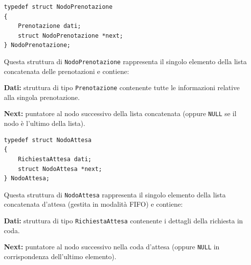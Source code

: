 \documentclass[11pt,a4paper,oneside,openany]{book}
\newenvironment{listacomp}{%
    \small
    \begin{list}{\textendash}{%
        \setlength{\topsep}{2pt}%
        \setlength{\partopsep}{0pt}%
        \setlength{\itemsep}{1pt}%
        \setlength{\parsep}{0pt}%
        \setlength{\leftmargin}{1.2em}%
    }%
}{%
    \end{list}%
}
\begin{document}
\vspace{0.2cm}
\begin{samepage}
\begin{lstlisting}[caption={Definizione della struttura NodoPrenotazione}]
typedef struct NodoPrenotazione
{
    Prenotazione dati;
    struct NodoPrenotazione *next;
} NodoPrenotazione;
\end{lstlisting}
Questa struttura di \texttt{NodoPrenotazione} rappresenta il singolo elemento della lista concatenata delle prenotazioni e contiene:
\begin{listacomp}
    \item \textbf{Dati:} struttura di tipo \texttt{Prenotazione} contenente tutte le informazioni relative alla singola prenotazione.
    \item \textbf{Next:} puntatore al nodo successivo della lista concatenata (oppure \texttt{NULL} se il nodo è l'ultimo della lista).
\end{listacomp}
\end{samepage}

\vspace{0.2cm}
\begin{samepage}
\begin{lstlisting}[caption={Definizione della struttura NodoAttesa}]
typedef struct NodoAttesa
{
    RichiestaAttesa dati;
    struct NodoAttesa *next;
} NodoAttesa;
\end{lstlisting}
Questa struttura di \texttt{NodoAttesa} rappresenta il singolo elemento della lista concatenata d'attesa (gestita in modalità FIFO) e contiene:
\begin{listacomp}
    \item \textbf{Dati:} struttura di tipo \texttt{RichiestaAttesa} contenente i dettagli della richiesta in coda.
    \item \textbf{Next:} puntatore al nodo successivo nella coda d'attesa (oppure \texttt{NULL} in corrispondenza dell'ultimo elemento).
\end{listacomp}
\end{samepage}
\end{document}
